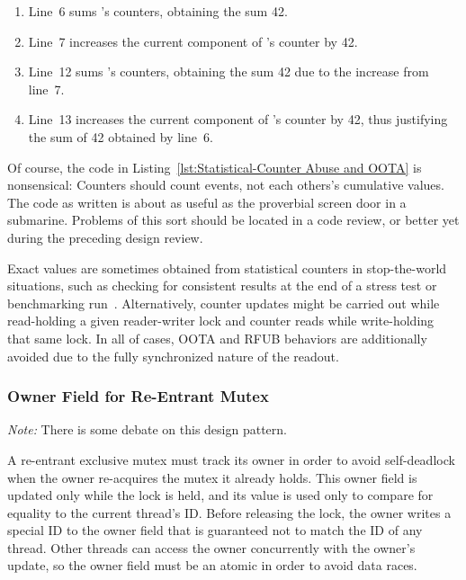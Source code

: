 \documentclass[10]{article}
\begin{document}
\begin{enumerate}
\item	Line~6 sums 's counters, obtaining the sum 42.
\item	Line~7 increases the current component of 's counter by 42.
\item	Line~12 sums 's counters, obtaining the sum 42 due to the
	increase from line~7.
\item	Line~13 increases the current component of 's counter by 42,
	thus justifying the sum of 42 obtained by line~6.
\end{enumerate}

Of course, the code in
Listing~\ref{lst:Statistical-Counter Abuse and OOTA}
is nonsensical: Counters should count events, not each others's cumulative
values.
The code as written is about as useful as the proverbial screen door in
a submarine.
Problems of this sort should be located in a code review, or better yet
during the preceding design review.

Exact values are sometimes obtained from statistical counters in
stop-the-world situations, such as checking for consistent results
at the end of a stress test or benchmarking
run~\cite[Sections 5.3 and 5.4]{McKenney2018ParallelProgramming-2018-12-08a}.
Alternatively, counter updates might be carried out while read-holding
a given reader-writer lock and counter reads while write-holding
that same lock.
In all of cases, OOTA and RFUB behaviors are additionally avoided due
to the fully synchronized nature of the readout.

\subsubsection{Owner Field for Re-Entrant Mutex}
\label{sec:Owner Field for Re-Entrant Mutex}

\emph{Note:} There is some debate on this design pattern.

A re-entrant exclusive mutex must track its owner in order to avoid
self-deadlock when the owner re-acquires the mutex it already holds.
This owner field is updated only while the lock is held, and its value
is used only to compare for equality to the current thread's ID.
Before releasing the lock, the owner writes a special ID to the owner
field that is guaranteed not to match the ID of any thread.
Other threads can access the owner concurrently with the owner's
update, so the owner field must be an atomic in order to avoid data races.
\end{document}
